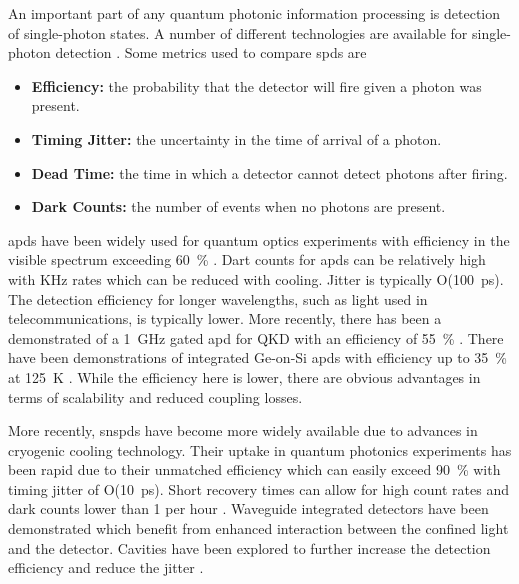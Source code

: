 An important part of any quantum photonic information processing is detection of single-photon states. A number of different technologies are available for single-photon detection \cite{hadfield2009single}. Some metrics used to compare \acp{spd} are

\begin{itemize}
	\item \textbf{Efficiency:} the probability that the detector will fire given a photon was present.
	\item \textbf{Timing Jitter:} the uncertainty in the time of arrival of a photon.
	\item \textbf{Dead Time:} the time in which a detector cannot detect photons after firing.
	\item \textbf{Dark Counts:} the number of events when no photons are present.
\end{itemize}

\Acp{apd} have been widely used for quantum optics experiments with efficiency in the visible spectrum exceeding \SI{60}{\percent} \cite{hadfield2009single}. Dart counts for \acp{apd} can be relatively high with \si{KHz} rates which can be reduced with cooling. Jitter is typically O(\SI{100}{ps}). The detection efficiency for longer wavelengths, such as light used in telecommunications, is typically lower. More recently, there has been a demonstrated of a \SI{1}{GHz} gated \ac{apd} for \ac{QKD} with an efficiency of \SI{55}{\percent} \cite{comandar2015gigahertz}. There have been demonstrations of integrated Ge-on-Si \acp{apd} with efficiency up to \SI{35}{\percent} at \SI{125}{\kelvin} \cite{Martinez2017Single, vines2019high}. While the efficiency here is lower, there are obvious advantages in terms of scalability and reduced coupling losses.


More recently, \acp{snspd} have become more widely available due to advances in cryogenic cooling technology. Their uptake in quantum photonics experiments has been rapid due to their unmatched efficiency which can easily exceed \SI{90}{\percent} with timing jitter of O(\SI{10}{ps}). Short recovery times can allow for high count rates and dark counts lower than 1 per hour \cite{wollman2017}. Waveguide integrated detectors have been demonstrated \cite{sprengers2011} which benefit from enhanced interaction between the confined light and the detector. Cavities have been explored to further increase the detection efficiency and reduce the jitter \cite{vetter2016, yun2019, tyler2016modelling}.

